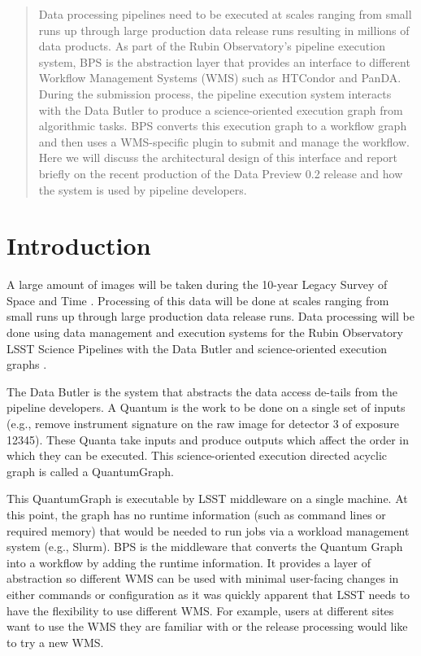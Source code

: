 \documentclass[11pt,twoside]{article}
\begin{document}
\begin{abstract}

Data processing pipelines need to be executed at scales ranging from
small runs up through large production data release runs resulting in
millions of data products.  As part of the Rubin Observatory's pipeline
execution system, BPS is the abstraction layer that provides an interface
to different Workflow Management Systems (WMS) such as HTCondor and PanDA.
During the submission process, the pipeline execution system interacts
with the Data Butler to produce a science-oriented execution graph from
algorithmic tasks.  BPS converts this execution graph to a workflow graph
and then uses a WMS-specific plugin to submit and manage the workflow.
Here we will discuss the architectural design of this interface and
report briefly on the recent production of the Data Preview 0.2 release
and how the system is used by pipeline developers.

\end{abstract}

\section{Introduction}

A large amount of images will be taken during the 10-year Legacy Survey
of Space and Time \citep[LSST;][]{2019ApJ...873..111I, I08_adassxxxii}.
Processing of this data will be done at scales ranging from small runs
up through large production data release runs.  Data processing will be
done using data management and execution systems for the Rubin Observatory
LSST Science Pipelines with the Data Butler and science-oriented execution
graphs \citep{C24_adassxxxii,2022SPIE12189E..11J}.

The Data Butler is the system that abstracts the data access de-tails from
the pipeline developers.  A Quantum is the work to be done on a single set
of inputs (e.g., remove instrument signature on the raw image for detector
3 of exposure 12345). These Quanta take inputs and produce outputs which
affect the order in which they can be executed.  This science-oriented
execution directed acyclic graph is called a QuantumGraph.

This QuantumGraph is executable by LSST middleware on a single machine.
At this point, the graph has no runtime information (such as command
lines or required memory) that would be needed to run jobs via
a workload management system (e.g., Slurm).  BPS is the middleware
that converts the Quantum Graph into a workflow by adding the runtime
information. It provides a layer of abstraction so different WMS can be
used with minimal user-facing changes in either commands or configuration
as it was quickly apparent that LSST needs to have the flexibility to
use different WMS. For example, users at different sites want to use
the WMS they are familiar with or the release processing would like to
try a new WMS.
\end{document}
